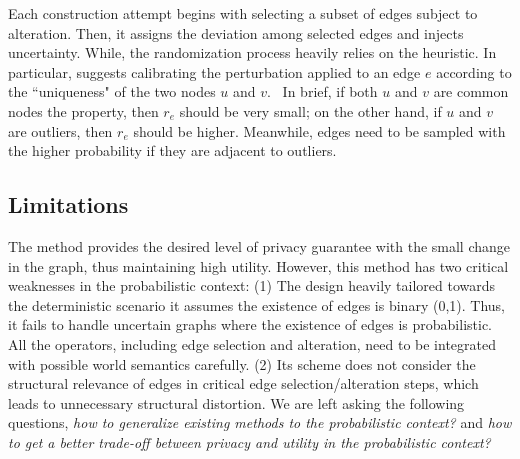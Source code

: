 Each construction attempt begins with selecting a subset of edges subject to alteration. 
Then, it assigns the deviation among selected edges and injects uncertainty. 
While, the randomization process heavily relies on the heuristic.  
In particular, {\soaName} suggests calibrating the perturbation applied to an edge $e$ according to the ``uniqueness" of the two nodes $u$ and $v$. 
In brief, if both $u$ and $v$ are common nodes {\wrt} the property, then $r_{e}$ should be very small; 
on the other hand, if $u$ and $v$ are outliers, then $r_{e}$ should be higher. 
Meanwhile, edges need to be sampled with the higher probability if they are adjacent to outliers. 

\subsection{Limitations} 
The {\soaName} method provides the desired level of privacy guarantee with the small change in the graph, thus maintaining high utility.
However, this method has two critical weaknesses in the probabilistic context:
(1) The design heavily tailored towards the deterministic scenario {\eg} it assumes the existence of edges is binary (0,1). Thus, it fails to handle uncertain graphs where the existence of edges is probabilistic. 
All the operators, including edge selection and alteration, need to be integrated with possible world semantics carefully.
(2) Its scheme does not consider the structural relevance of edges in critical edge selection/alteration steps, which leads to unnecessary structural distortion.
We are left asking the following questions, \emph{how to generalize existing methods to the probabilistic context?} and \emph{how to get a better trade-off between privacy and utility in the probabilistic context?} 